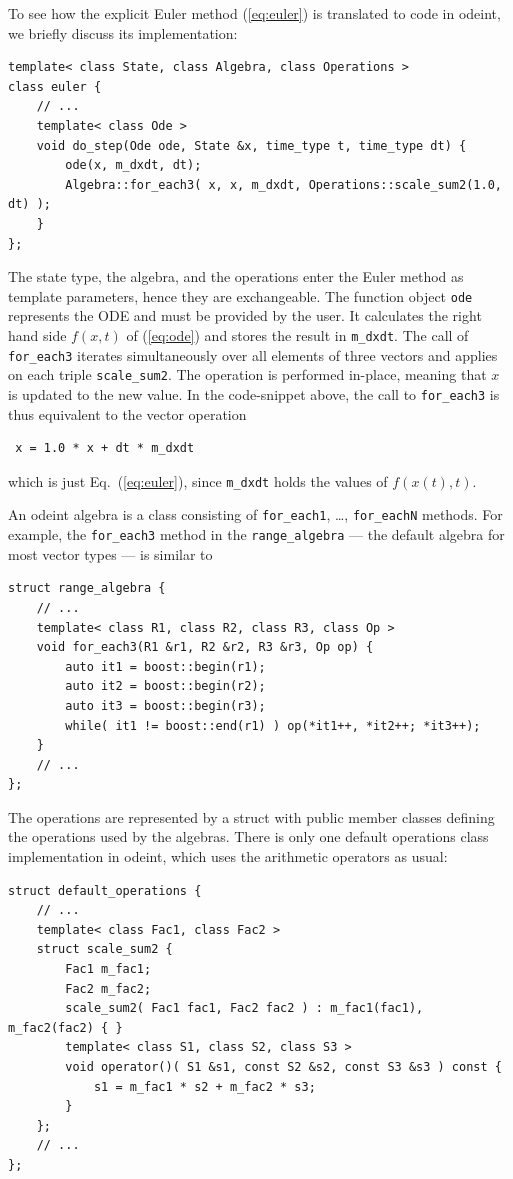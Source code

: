 \documentclass[final]{siamltex}
\newcommand{\code}[1]{\lstinline|#1|}
\newcommand{\eqref}[1]{(\ref{#1})}
\begin{document}
To see how the explicit Euler method \eqref{eq:euler} is translated to
code in odeint, we briefly discuss its implementation:
\begin{lstlisting}
template< class State, class Algebra, class Operations >
class euler {
    // ...
    template< class Ode >
    void do_step(Ode ode, State &x, time_type t, time_type dt) {
        ode(x, m_dxdt, dt);
        Algebra::for_each3( x, x, m_dxdt, Operations::scale_sum2(1.0, dt) );
    }
};
\end{lstlisting}
The state type, the algebra, and the operations enter the Euler method
as template parameters, hence they are exchangeable. The function
object \code{ode} represents the ODE and must be provided by the
user. It calculates the right hand side $f(x,t)$ of \eqref{eq:ode} and
stores the result in \code{m_dxdt}.  The call of \code{for_each3}
iterates simultaneously over all elements of three vectors and applies
on each triple \code{scale_sum2}. The operation is performed in-place,
meaning that $x$ is updated to the new value.  In the code-snippet
above, the call to \code{for_each3} is thus equivalent to the vector
operation
\begin{lstlisting}
 x = 1.0 * x + dt * m_dxdt
\end{lstlisting}
which is just Eq.~\eqref{eq:euler}, since \code{m_dxdt} holds the values of
$f(x(t), t)$.

An odeint algebra is a class consisting of
\code{for_each1}, \dots, \code{for_eachN} methods. For example, the
\code{for_each3} method in the \code{range_algebra} --- the default algebra for
most vector types --- is similar to
\begin{lstlisting}
struct range_algebra {
    // ...
    template< class R1, class R2, class R3, class Op >
    void for_each3(R1 &r1, R2 &r2, R3 &r3, Op op) {
        auto it1 = boost::begin(r1);
        auto it2 = boost::begin(r2);
        auto it3 = boost::begin(r3);
        while( it1 != boost::end(r1) ) op(*it1++, *it2++; *it3++);
    }
    // ...
};
\end{lstlisting}
The operations are represented by a struct with public member classes defining the
operations used by the algebras. There is only one default
operations class implementation in odeint, which uses the arithmetic operators as usual:
\begin{lstlisting}
struct default_operations {
    // ...
    template< class Fac1, class Fac2 >
    struct scale_sum2 {
        Fac1 m_fac1;
        Fac2 m_fac2;
        scale_sum2( Fac1 fac1, Fac2 fac2 ) : m_fac1(fac1), m_fac2(fac2) { }
        template< class S1, class S2, class S3 >
        void operator()( S1 &s1, const S2 &s2, const S3 &s3 ) const {
            s1 = m_fac1 * s2 + m_fac2 * s3;
        }
    };
    // ...
};
\end{lstlisting}
\end{document}
